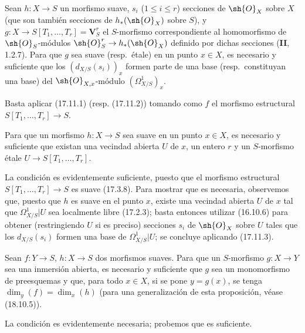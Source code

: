 \begin{corollary}[17.11.3]
\label{IV.17.11.3}
Sean $h:X\to S$ un morfismo suave, $s_i$ \textup{($1\leq i\leq r$)} secciones de $\sh{O}_X$ sobre $X$ \textup{(}que son también secciones de $h_*(\sh{O}_X)$ sobre $S$\textup{)}, y $g:X\to S[T_1,\ldots,T_r]=\mathbf{V}_S^r$ el $S$-morfismo correspondiente al homomorfismo de $\sh{O}_S$-módulos $\sh{O}_S^r\to h_*(\sh{O}_X)$ definido por dichas secciones \textup{(\textbf{II}, 1.2.7)}. Para que $g$ sea suave \textup{(resp.}\ étale\textup{)} en un punto $x\in X$, es necesario y suficiente que los $(d_{X/S}(s_i))_x$ formen parte de una base \textup{(resp.}\ constituyan una base\textup{)} del $\sh{O}_{X,x}$-módulo $(\varOmega^1_{X/S})_x$.
\end{corollary}

Basta aplicar (17.11.1) (resp. (17.11.2)) tomando como $f$ el morfismo estructural $S[T_1,\ldots,T_r]\to S$.

\begin{corollary}[17.11.4]
\label{IV.17.11.4}
Para que un morfismo $h:X\to S$ sea suave en un punto $x\in X$, es necesario y suficiente que existan una vecindad abierta $U$ de $x$, un entero $r$ y un $S$-morfismo étale $U\to S[T_1,\ldots,T_r]$.
\end{corollary}


La condición es evidentemente suficiente, puesto que el morfismo estructural $S[T_1,\ldots,T_r]\to S$ es suave (17.3.8). Para mostrar que es necesaria, observemos que, puesto que $h$ es suave en el punto $x$, existe una vecindad abierta $U$ de $x$ tal que $\varOmega^1_{X/S}|U$ sea localmente libre (17.2.3); basta entonces utilizar (16.10.6) para obtener (restringiendo $U$ si es preciso) secciones $s_i$ de $\sh{O}_X$ sobre $U$ tales que los $d_{X/S}(s_i)$ formen una base de $\varOmega^1_{X/S}|U$; se concluye aplicando (17.11.3).

\begin{proposition}[17.11.5]
\label{IV.17.11.5}
Sean $f:Y\to S$, $h:X\to S$ dos morfismos suaves. Para que un $S$-morfismo $g:X\to Y$ sea una inmersión abierta, es necesario y suficiente que $g$ sea un monomorfismo de preesquemas y que, para todo $x\in X$, si se pone $y=g(x)$, se tenga $\dim_y(f)=\dim_x(h)$ \textup{(para una generalización de esta proposición, véase (18.10.5))}.
\end{proposition}

La condición es evidentemente necesaria; probemos que es suficiente.

